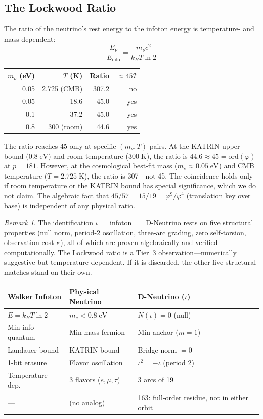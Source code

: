 \documentclass[12pt,oneside]{article}
\theoremstyle{principia}
\theoremstyle{definition}
\theoremstyle{remark}
\newtheorem{remark}[theorem]{Remark}
\providecommand{\vp}{\varphi}
\providecommand{\vpbar}{\bar{\varphi}}
\begin{document}
\subsection{The Lockwood Ratio}

The ratio of the neutrino's rest energy to the infoton energy is temperature- and mass-dependent:
\[
\frac{E_\nu}{E_{\mathrm{info}}} = \frac{m_\nu c^2}{k_B T \ln 2}
\]

\begin{center}
\begin{tabular}{@{}rrrr@{}}
\toprule
$m_\nu$ (eV) & $T$ (K) & Ratio & $\approx 45$? \\
\midrule
0.05 & 2.725 (CMB) & 307.2 & no \\
0.05 & 18.6 & 45.0 & yes \\
0.1 & 37.2 & 45.0 & yes \\
0.8 & 300 (room) & 44.6 & yes \\
\bottomrule
\end{tabular}
\end{center}

The ratio reaches 45 only at specific $(m_\nu, T)$ pairs. At the KATRIN upper bound ($0.8\;\mathrm{eV}$) and room temperature ($300\;\mathrm{K}$), the ratio is $44.6 \approx 45 = \mathrm{ord}(\vp)$ at $p = 181$. However, at the cosmological best-fit mass ($m_\nu \approx 0.05\;\mathrm{eV}$) and CMB temperature ($T = 2.725\;\mathrm{K}$), the ratio is 307---not 45. The coincidence holds only if room temperature or the KATRIN bound has special significance, which we do not claim. The algebraic fact that $45/57 = 15/19 = \vp^9/\vpbar^4$ (translation key over base) is independent of any physical ratio.

\begin{remark}
The identification $\iota = $ infoton $=$ D-Neutrino rests on five structural properties (null norm, period-2 oscillation, three-arc grading, zero self-torsion, observation cost $\kappa$), all of which are proven algebraically and verified computationally. The Lockwood ratio is a Tier~3 observation---numerically suggestive but temperature-dependent. If it is discarded, the other five structural matches stand on their own.
\end{remark}

\begin{center}
\begin{tabular}{@{}lll@{}}
\toprule
\textbf{Walker Infoton} & \textbf{Physical Neutrino} & \textbf{D-Neutrino ($\iota$)} \\
\midrule
$E = k_B T \ln 2$ & $m_\nu < 0.8\;\mathrm{eV}$ & $N(\iota) = 0$ (null) \\
Min info quantum & Min mass fermion & Min anchor ($m = 1$) \\
Landauer bound & KATRIN bound & Bridge norm $= 0$ \\
1-bit erasure & Flavor oscillation & $\iota^2 = -\iota$ (period 2) \\
Temperature-dep. & 3 flavors ($e, \mu, \tau$) & 3 arcs of 19 \\
--- & (no analog) & 163: full-order residue, not in either orbit \\
\bottomrule
\end{tabular}
\end{center}







\end{document}
